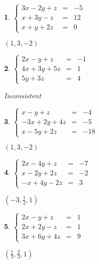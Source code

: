 \documentclass{amsbook}
\newtheorem{exc}{}
\newenvironment{ex}{\begin{exc}\normalfont}{\end{exc}}
\numberwithin{section}{chapter}
\numberwithin{equation}{chapter}
\begin{document}
\begin{multicols}{2}
\begin{ex}
	$\left\{ \begin{array}{rcr} 3x-2y+z & = & -5 \\ x+3y-z & = & 12 \\ x+y+2z & = & 0  \end{array} \right.$
	\begin{sol}
		 $(1,3,-2)$
	\end{sol}
\end{ex}

\begin{ex}
	 $\left\{ \begin{array}{rcr} 2x-y+z& = & -1 \\ 4x+3y+5z & = & 1 \\  5y+3z & = & 4 \end{array} \right.$
	\begin{sol}
	 	Inconsistent
	\end{sol}
\end{ex}


\begin{ex}
	 $\left\{ \begin{array}{rcr} x-y+z & = & -4 \\ -3x+2y+4z & = & -5 \\ x-5y+2z & = & -18  \end{array} \right.$
	\begin{sol}
		$(1,3,-2)$
	\end{sol}
\end{ex}

\begin{ex}
	 $\left\{ \begin{array}{rcr} 2x-4y+z & = & -7 \\ x-2y+2z & = & -2 \\ -x+4y-2z & = & 3  \end{array} \right.$
	
	\begin{sol}
		 $\left(-3,\frac{1}{2},1\right)$
	\end{sol}
\end{ex}


\begin{ex}
	 $\left\{ \begin{array}{rcr} 2x-y+z & = & 1 \\ 2x+2y-z & = & 1 \\ 3x+6y+4z & = & 9  \end{array} \right.$
	\begin{sol}
		 $\left(\frac{1}{3},\frac{2}{3},1\right)$
	\end{sol}
\end{ex}


\end{multicols}
\end{document}
